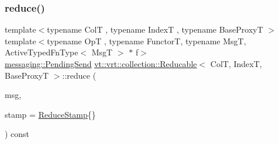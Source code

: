 \mbox{\label{structvt_1_1vrt_1_1collection_1_1_reducable_a6550107ef0246a7479dec51b015aa0f5}} 
\subsubsection{\texorpdfstring{reduce()}{reduce()}\hspace{0.1cm}{\footnotesize\ttfamily [5/8]}}
{\footnotesize\ttfamily template$<$typename ColT , typename IndexT , typename Base\+ProxyT $>$ \\
template$<$typename OpT , typename FunctorT, typename MsgT, Active\+Typed\+Fn\+Type$<$ Msg\+T $>$ $\ast$ f$>$ \\
\hyperlink{structvt_1_1messaging_1_1_pending_send}{messaging\+::\+Pending\+Send} \hyperlink{structvt_1_1vrt_1_1collection_1_1_reducable}{vt\+::vrt\+::collection\+::\+Reducable}$<$ ColT, IndexT, Base\+ProxyT $>$\+::reduce (\begin{DoxyParamCaption}\item[{MsgT $\ast$const}]{msg,  }\item[{\hyperlink{structvt_1_1vrt_1_1collection_1_1_reducable_a19f80baf23f36dad4948ef07322fd0cb}{Reduce\+Stamp}}]{stamp = {\ttfamily \hyperlink{structvt_1_1vrt_1_1collection_1_1_reducable_a19f80baf23f36dad4948ef07322fd0cb}{Reduce\+Stamp}\{\}} }\end{DoxyParamCaption}) const}

\mbox{\label{structvt_1_1vrt_1_1collection_1_1_reducable_a3333825bf69de10656ca60eeddff773d}} 
